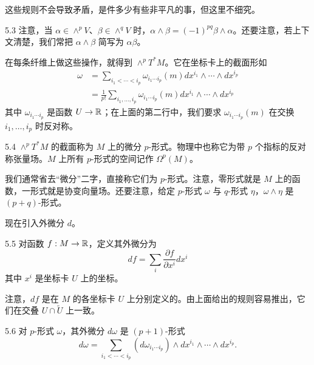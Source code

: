 这些规则不会导致矛盾，是件多少有些非平凡的事，但这里不细究。

\begin{remark}{5.3}
注意，当 $\alpha\in\wedge^pV$、$\beta\in\wedge^qV$ 时，$\alpha\wedge\beta=(-1)^{pq}\beta\wedge\alpha$。还要注意，若上下文清楚，我们常把 $\alpha\wedge\beta$ 简写为 $\alpha\beta$。
\end{remark}

在每条纤维上做这些操作，就得到 $\wedge^pT^*M$。它在坐标卡上的截面形如
\begin{align}
  \omega&=\sum_{i_1<\cdots<i_p}\omega_{i_1\cdots i_p}(m)dx^{i_1}\wedge\cdots\wedge dx^{i_p} \tag{5.8}\\
  &=\frac{1}{p!}\sum_{i_1,\dots,i_p}\omega_{i_1\cdots i_p}(m)dx^{i_1}\wedge\cdots\wedge dx^{i_p} \tag{5.9}
\end{align}
其中 $\omega_{i_1\cdots i_p}$ 是函数 $U\to\mathbb{R}$；在上面的第二行中，我们要求 $\omega_{i_1\cdots i_p}(m)$ 在交换 $i_1,\dots,i_p$ 时反对称。

\begin{definition}{5.4}
  $\wedge^pT^*M$ 的截面称为 $M$ 上的微分 $p$-形式。物理中也称它为带 $p$ 个指标的反对称张量场。$M$ 上所有 $p$-形式的空间记作 $\Omega^p(M)$。
\end{definition}

我们通常省去“微分”二字，直接称它们为 $p$-形式。注意，零形式就是 $M$ 上的函数，一形式就是协变向量场。还要注意，给定 $p$-形式 $\omega$ 与 $q$-形式 $\eta$，$\omega\wedge\eta$ 是 $(p+q)$-形式。

现在引入外微分 $d$。

\begin{definition}{5.5}
  对函数 $f:M\to\mathbb{R}$，定义其外微分为
  \begin{equation}
    df=\sum_i\frac{\partial f}{\partial x^i}dx^i
    \tag{5.10}
  \end{equation}
  其中 $x^i$ 是坐标卡 $U$ 上的坐标。
\end{definition}

注意，$df$ 是在 $M$ 的各坐标卡 $U$ 上分别定义的。由上面给出的规则容易推出，它们在交叠 $U\cap\tilde U$ 上一致。

\begin{definition}{5.6}
  对 $p$-形式 $\omega$，其外微分 $d\omega$ 是 $(p+1)$-形式
  \begin{equation}
    d\omega=\sum_{i_1<\cdots<i_p}(d\omega_{i_1\cdots i_p})\wedge dx^{i_1}\wedge\cdots\wedge dx^{i_p}.
    \tag{5.11}
  \end{equation}
\end{definition}

